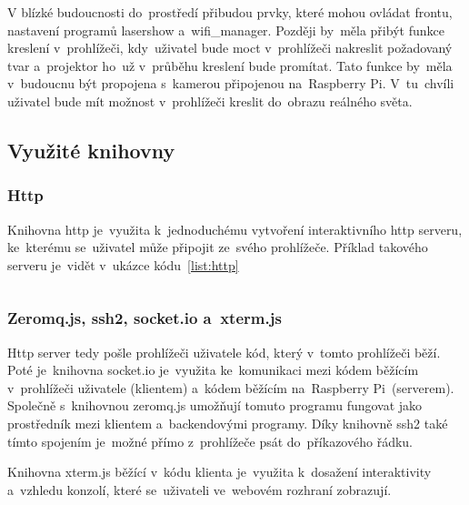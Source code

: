 
V blízké budoucnosti do~prostředí přibudou prvky, které mohou ovládat frontu, nastavení programů lasershow  a~wifi\_manager. Později by~měla přibýt funkce kreslení  v~prohlížeči,  kdy~uživatel bude moct  v~prohlížeči nakreslit požadovaný tvar  a~projektor ho~už  v~průběhu kreslení bude promítat. Tato funkce by~měla  v~budoucnu být propojena  s~kamerou připojenou na~Raspberry Pi.  V~tu~chvíli uživatel bude mít možnost  v~prohlížeči kreslit do~obrazu reálného světa.

\subsection{Využité knihovny}
\subsubsection{Http}
Knihovna http  je~využita  k~jednoduchému vytvoření interaktivního http serveru, ke~kterému se~uživatel může připojit ze~svého prohlížeče. Příklad takového serveru  je~vidět  v~ukázce kódu~\ref{list:http}
\begin{code}
    \inputminted[frame=lines,fontsize=\footnotesize{}, linenos, breaklines]{js}{code_examples/http_static_files.js}
\end{code}
    
\subsubsection{Zeromq.js, ssh2, socket.io  a~xterm.js}
Http server tedy pošle prohlížeči uživatele kód, který  v~tomto prohlížeči běží. Poté je~knihovna socket.io je~využita ke~komunikaci mezi kódem běžícím  v~prohlížeči uživatele (klientem)  a~kódem běžícím na~Raspberry Pi~(serverem).
Společně  s~knihovnou zeromq.js umožňují tomuto programu fungovat jako prostředník mezi klientem  a~backendovými programy. Díky knihovně ssh2 také tímto spojením je~možné přímo  z~prohlížeče psát do~příkazového řádku.

Knihovna xterm.js běžící  v~kódu klienta je~využita  k~dosažení interaktivity  a~vzhledu konzolí, které se~uživateli ve~webovém rozhraní zobrazují.

